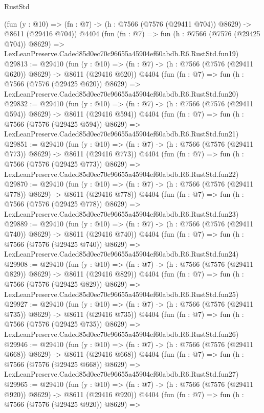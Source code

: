 \begin{lexlean}{RustStd}
\begin{coremodule}
    (fun (y : @10) => (fn : @7) -> (h : @7566 (@7576 (@29411 @704)) @8629) -> @8611 (@29416 @704))
    @4404
    (fun (fn : @7) =>
    fun (h : @7566 (@7576 (@29425 @704)) @8629) =>
    LexLeanPreserve.Caded85d0ec70c96655a45904ef60abdb.R6.RustStd.fun19)
@29813 := @29410
    (fun (y : @10) => (fn : @7) -> (h : @7566 (@7576 (@29411 @620)) @8629) -> @8611 (@29416 @620))
    @4404
    (fun (fn : @7) =>
    fun (h : @7566 (@7576 (@29425 @620)) @8629) =>
    LexLeanPreserve.Caded85d0ec70c96655a45904ef60abdb.R6.RustStd.fun20)
@29832 := @29410
    (fun (y : @10) => (fn : @7) -> (h : @7566 (@7576 (@29411 @594)) @8629) -> @8611 (@29416 @594))
    @4404
    (fun (fn : @7) =>
    fun (h : @7566 (@7576 (@29425 @594)) @8629) =>
    LexLeanPreserve.Caded85d0ec70c96655a45904ef60abdb.R6.RustStd.fun21)
@29851 := @29410
    (fun (y : @10) => (fn : @7) -> (h : @7566 (@7576 (@29411 @773)) @8629) -> @8611 (@29416 @773))
    @4404
    (fun (fn : @7) =>
    fun (h : @7566 (@7576 (@29425 @773)) @8629) =>
    LexLeanPreserve.Caded85d0ec70c96655a45904ef60abdb.R6.RustStd.fun22)
@29870 := @29410
    (fun (y : @10) => (fn : @7) -> (h : @7566 (@7576 (@29411 @778)) @8629) -> @8611 (@29416 @778))
    @4404
    (fun (fn : @7) =>
    fun (h : @7566 (@7576 (@29425 @778)) @8629) =>
    LexLeanPreserve.Caded85d0ec70c96655a45904ef60abdb.R6.RustStd.fun23)
@29889 := @29410
    (fun (y : @10) => (fn : @7) -> (h : @7566 (@7576 (@29411 @740)) @8629) -> @8611 (@29416 @740))
    @4404
    (fun (fn : @7) =>
    fun (h : @7566 (@7576 (@29425 @740)) @8629) =>
    LexLeanPreserve.Caded85d0ec70c96655a45904ef60abdb.R6.RustStd.fun24)
@29908 := @29410
    (fun (y : @10) => (fn : @7) -> (h : @7566 (@7576 (@29411 @829)) @8629) -> @8611 (@29416 @829))
    @4404
    (fun (fn : @7) =>
    fun (h : @7566 (@7576 (@29425 @829)) @8629) =>
    LexLeanPreserve.Caded85d0ec70c96655a45904ef60abdb.R6.RustStd.fun25)
@29927 := @29410
    (fun (y : @10) => (fn : @7) -> (h : @7566 (@7576 (@29411 @735)) @8629) -> @8611 (@29416 @735))
    @4404
    (fun (fn : @7) =>
    fun (h : @7566 (@7576 (@29425 @735)) @8629) =>
    LexLeanPreserve.Caded85d0ec70c96655a45904ef60abdb.R6.RustStd.fun26)
@29946 := @29410
    (fun (y : @10) => (fn : @7) -> (h : @7566 (@7576 (@29411 @668)) @8629) -> @8611 (@29416 @668))
    @4404
    (fun (fn : @7) =>
    fun (h : @7566 (@7576 (@29425 @668)) @8629) =>
    LexLeanPreserve.Caded85d0ec70c96655a45904ef60abdb.R6.RustStd.fun27)
@29965 := @29410
    (fun (y : @10) => (fn : @7) -> (h : @7566 (@7576 (@29411 @920)) @8629) -> @8611 (@29416 @920))
    @4404
    (fun (fn : @7) =>
    fun (h : @7566 (@7576 (@29425 @920)) @8629) =>

\end{coremodule}
\end{lexlean}
